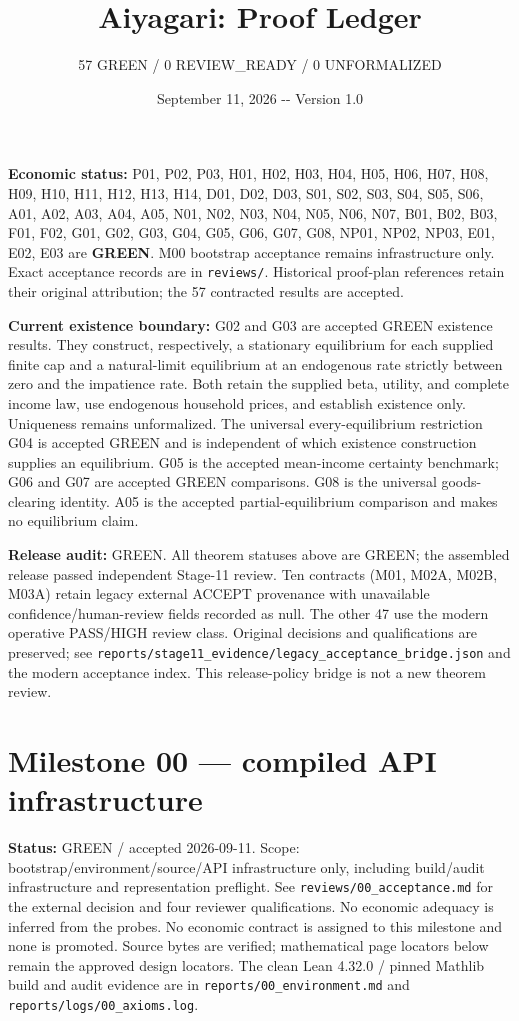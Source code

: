 \documentclass[
  11pt,
]{article}
\title{Aiyagari: Proof Ledger}
\subtitle{57 GREEN / 0 REVIEW\_READY / 0 UNFORMALIZED}
\author{}
\date{September 11, 2026 -\/- Version 1.0}
\let\LedgerOriginalTexttt\texttt
\renewcommand{\texttt}[1]{{\small\LedgerOriginalTexttt{#1}}}
\begin{document}
\maketitle

\textbf{Economic status:} P01, P02, P03, H01, H02, H03, H04, H05, H06,
H07, H08, H09, H10, H11, H12, H13, H14, D01, D02, D03, S01, S02, S03,
S04, S05, S06, A01, A02, A03, A04, A05, N01, N02, N03, N04, N05, N06,
N07, B01, B02, B03, F01, F02, G01, G02, G03, G04, G05, G06, G07, G08,
NP01, NP02, NP03, E01, E02, E03 are \textbf{GREEN}. M00 bootstrap
acceptance remains infrastructure only. Exact acceptance records are in
\texttt{reviews/}. Historical proof-plan references retain their
original attribution; the 57 contracted results are accepted.

\textbf{Current existence boundary:} G02 and G03 are accepted GREEN
existence results. They construct, respectively, a stationary
equilibrium for each supplied finite cap and a natural-limit equilibrium
at an endogenous rate strictly between zero and the impatience rate.
Both retain the supplied beta, utility, and complete income law, use
endogenous household prices, and establish existence only. Uniqueness
remains unformalized. The universal every-equilibrium restriction G04 is
accepted GREEN and is independent of which existence construction
supplies an equilibrium. G05 is the accepted mean-income certainty
benchmark; G06 and G07 are accepted GREEN comparisons. G08 is the
universal goods-clearing identity. A05 is the accepted
partial-equilibrium comparison and makes no equilibrium claim.

\textbf{Release audit:} GREEN. All theorem statuses above are GREEN; the
assembled release passed independent Stage-11 review. Ten contracts
(M01, M02A, M02B, M03A) retain legacy external ACCEPT provenance with
unavailable confidence/human-review fields recorded as null. The other
47 use the modern operative PASS/HIGH review class. Original decisions
and qualifications are preserved; see
\texttt{reports/stage11\_evidence/legacy\_acceptance\_bridge.json} and
the modern acceptance index. This release-policy bridge is not a new
theorem review.

\section{Milestone 00 --- compiled API
infrastructure}\label{milestone-00-compiled-api-infrastructure}

\textbf{Status:} GREEN / accepted 2026-09-11. Scope:
bootstrap/environment/source/API infrastructure only, including
build/audit infrastructure and representation preflight. See
\texttt{reviews/00\_acceptance.md} for the external decision and four
reviewer qualifications. No economic adequacy is inferred from the
probes. No economic contract is assigned to this milestone and none is
promoted. Source bytes are verified; mathematical page locators below
remain the approved design locators. The clean Lean 4.32.0 / pinned
Mathlib build and audit evidence are in
\texttt{reports/00\_environment.md} and
\texttt{reports/logs/00\_axioms.log}.
\end{document}
